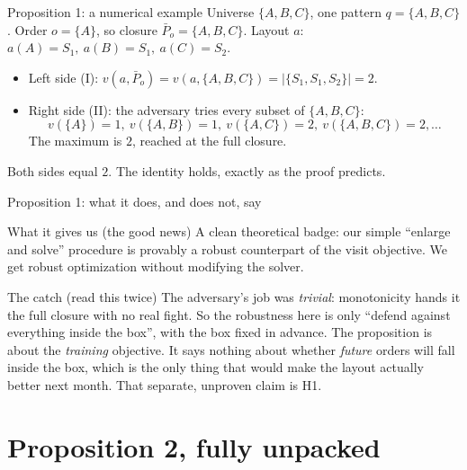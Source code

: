 \documentclass[11pt,aspectratio=169]{beamer}
\newcommand{\bd}[1]{\textcolor{bad}{#1}}
\begin{document}
\begin{frame}{Proposition 1: a numerical example}
  Universe $\{A,B,C\}$, one pattern $q=\{A,B,C\}$. Order $o=\{A\}$, so closure $\bar P_o=\{A,B,C\}$.
  Layout $a$: $a(A)=S_1,\ a(B)=S_1,\ a(C)=S_2$.
  \begin{itemize}
    \item Left side (I): $v(a,\bar P_o)=v(a,\{A,B,C\})=|\{S_1,S_1,S_2\}|=2$.
    \item Right side (II): the adversary tries every subset of $\{A,B,C\}$:
    \[
    v(\{A\})=1,\ v(\{A,B\})=1,\ v(\{A,C\})=2,\ v(\{A,B,C\})=2,\dots
    \]
    The maximum is $2$, reached at the full closure.
  \end{itemize}
  Both sides equal $2$. The identity holds, exactly as the proof predicts.
\end{frame}

\begin{frame}{Proposition 1: what it does, and does not, say}
  \begin{block}{What it gives us (the good news)}
  A clean theoretical badge: our simple ``enlarge and solve'' procedure is provably a robust counterpart of the visit objective. We get robust optimization without modifying the solver.
  \end{block}
  \begin{alertblock}{The catch (read this twice)}
  The adversary's job was \emph{trivial}: monotonicity hands it the full closure with no real fight. So the robustness here is only ``defend against everything inside the box'', with the box fixed in advance. The proposition is about the \emph{training} objective. It says \bd{nothing} about whether \emph{future} orders will fall inside the box, which is the only thing that would make the layout actually better next month. That separate, unproven claim is H1.
  \end{alertblock}
\end{frame}

\section{Proposition 2, fully unpacked}
\end{document}
